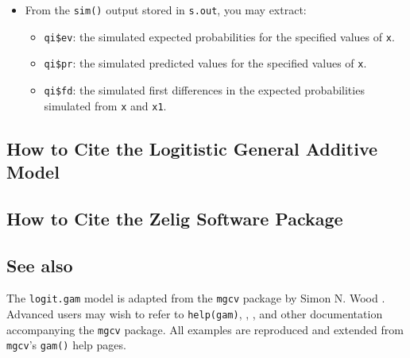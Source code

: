 \begin{itemize}
\item From the {\tt sim()} output stored in {\tt s.out}, you may extract:
\begin{itemize}
\item {\tt qi\$ev}: the simulated expected probabilities for the specified values of {\tt x}.
\item {\tt qi\$pr}: the simulated predicted values for the specified values of {\tt x}.
\item {\tt qi\$fd}: the simulated first differences in the expected probabilities simulated from {\tt x} and {\tt x1}.
\end{itemize}
\end{itemize}

\subsection*{How to Cite the Logitistic General Additive Model}

\subsection*{How to Cite the Zelig Software Package}
\CiteZelig

\subsection* {See also}
The {\tt logit.gam} model is adapted from the  {\tt mgcv} package by Simon N. Wood \citep{Wood06}. Advanced users may wish to refer to {\tt help(gam)},  \cite{Wood04}, \cite{Wood00}, and other documentation accompanying the {\tt mgcv} package. All examples are reproduced and extended from {\tt mgcv}'s {\tt gam()} help pages.



